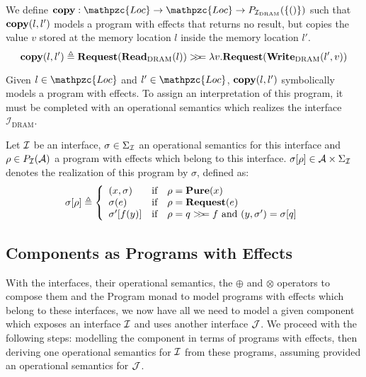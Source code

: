 \begin{example}[Copy]
  We define $\func{copy} : \mathpzc{Loc} \rightarrow \mathpzc{Loc} \rightarrow
  P_{\I_{\mathrm{DRAM}}}(\{()\})$ such that $\mathbf{\mathbf{copy}}(l, l')$ models a
  program with effects that returns no result, but copies the value $v$ stored
  at the memory location $l$ inside the memory location $l'$.
  \[ \mathbf{\mathbf{copy}}(l, l') \triangleq \mathbf{\mathbf{Request}}(\mathbf{\mathbf{Read}}_{\mathrm{DRAM}}(l))
    >\!\!>\!\!= \lambda v. \mathbf{\mathbf{Request}}(\mathbf{\mathbf{Write}}_{\mathrm{DRAM}}(l', v))
  \]
\end{example}

Given $l \in \mathpzc{Loc}$ and $l' \in \mathpzc{Loc}$, $\mathbf{\mathbf{copy}}(l, l')$
symbolically models a program with effects.
%
To assign an interpretation of this program, it must be completed with an
operational semantics which realizes the interface $\mathcal{I}_{\mathrm{DRAM}}$.

\begin{definition} \label{def:freespec:realisation}
  Let $\mathcal{I}$ be an interface, $\sigma \in \Sigma_{\mathcal{I}}$ an operational
  semantics for this interface and $\rho \in P_{\mathcal{I}}(\mathcal{A})$ a program with
  effects which belong to this interface.
  $\sigma[\rho] \in \mathcal{A} \times \Sigma_{\mathcal{I}}$ denotes the realization of
  this program by $\sigma$, defined as:
  \[ \sigma[\rho] \triangleq \left\{
      \begin{array}{lcl} (x, \sigma) & \text{if} & \rho =
                                                   \mathbf{\mathbf{Pure}}(x) \\
        \sigma(e) & \text{if} & \rho =
                                \mathbf{\mathbf{Request}}(e) \\
        \sigma'[f(y)] & \text{if} & \rho =
                                    q >\!\!>\!\!= f\text{ and }(y, \sigma') = \sigma[q] \\
      \end{array}
    \right.
  \]
\end{definition}

\subsection{Components as Programs with Effects}

With the interfaces, their operational semantics, the $\oplus$ and $\otimes$
operators to compose them and the Program monad to model programs with effects
which belong to these interfaces, we now have all we need to model a given
component which exposes an interface $\mathcal{I}$ and uses another interface
$\mathcal{J}$.
%
We proceed with the following steps: modelling the component in terms of
programs with effects, then deriving one operational semantics for $\mathcal{I}$ from
these programs, assuming provided an operational semantics for $\mathcal{J}$.

